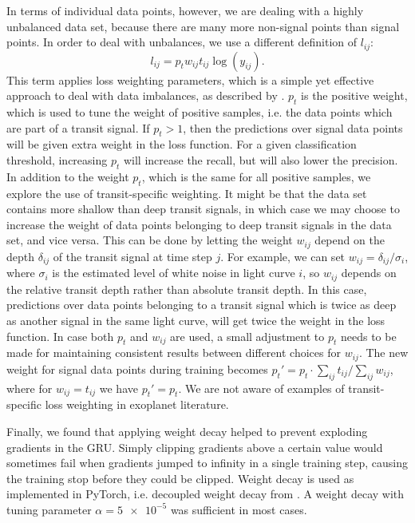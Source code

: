 

In terms of individual data points, however, we are dealing with a highly unbalanced data set, because there are many more non-signal points than signal points. In order to deal with unbalances, we use a different definition of $l_{ij}$:
\begin{equation}
    l_{ij} = p_t w_{ij} t_{ij} \log( y_{ij} ).
\end{equation}
\noindent This term applies loss weighting parameters, which is a simple yet effective approach to deal with data imbalances, as described by \cite{he2009learning}. $p_t$ is the positive weight, which is used to tune the weight of positive samples, i.e. the data points which are part of a transit signal. If $p_t > 1$, then the predictions over signal data points will be given extra weight in the loss function. For a given classification threshold, increasing $p_t$ will increase the recall, but will also lower the precision. In addition to the weight $p_t$, which is the same for all positive samples, we explore the use of transit-specific weighting. It might be that the data set contains more shallow than deep transit signals, in which case we may choose to increase the weight of data points belonging to deep transit signals in the data set, and vice versa. This can be done by letting the weight $w_{ij}$ depend on the depth $\delta_{ij}$ of the transit signal at time step $j$. For example, we can set $w_{ij} = \delta_{ij} / \sigma_{i}$, where $\sigma_i$ is the estimated level of white noise in light curve $i$, so $w_{ij}$ depends on the relative transit depth rather than absolute transit depth. In this case, predictions over data points belonging to a transit signal which is twice as deep as another signal in the same light curve, will get twice the weight in the loss function. In case both $p_t$ and $w_{ij}$ are used, a small adjustment to $p_t$ needs to be made for maintaining consistent results between different choices for $w_{ij}$. The new weight for signal data points during training becomes  $p_t' = p_t \cdot \sum_{ij} t_{ij} / \sum_{ij} w_{ij}$, where for $w_{ij} = t_{ij}$ we have $p_t' = p_t$. We are not aware of examples of transit-specific loss weighting in exoplanet literature.

Finally, we found that applying weight decay helped to prevent exploding gradients in the GRU. Simply clipping gradients above a certain value would sometimes fail when gradients jumped to infinity in a single training step, causing the training stop before they could be clipped. Weight decay is used as implemented in PyTorch, i.e. decoupled weight decay from \cite{loshchilov2017decoupled}. A weight decay with tuning parameter $\alpha=\num{5e-5}$ was sufficient in most cases.

